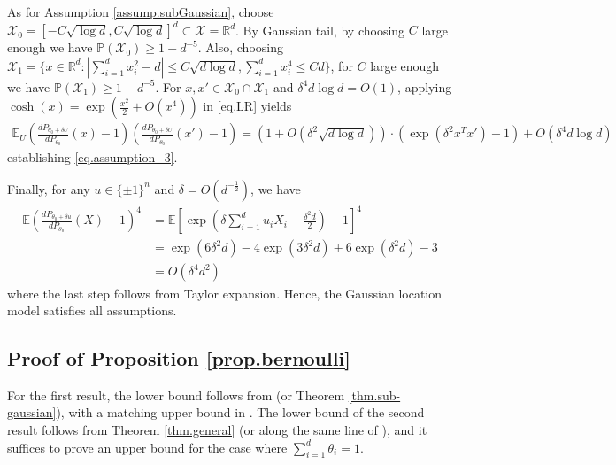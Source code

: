 \documentclass[final,12pt]{colt2018} %
\def \bP {\mathbb{P}}
\def \bE {\mathbb{E}}
\def \bR {\mathbb{R}}
\newcommand{\calX}{{\mathcal{X}}}
\begin{document}
As for Assumption \eqref{assump.subGaussian}, choose $\calX_0 = [-C\sqrt{\log d}, C\sqrt{\log d}]^d\subset \calX=\bR^d$. By Gaussian tail, by choosing $C$ large enough we have $\bP(\calX_0)\ge 1-d^{-5}$. Also, choosing $\calX_1 = \{x\in \bR^d: |\sum_{i=1}^d x_i^2 - d|\le C\sqrt{d\log d}, \sum_{i=1}^d x_i^4\le Cd\}$, for $C$ large enough we have $\bP(\calX_1)\ge 1-d^{-5}$. For $x,x'\in\calX_0\cap\calX_1$ and $\delta^4d\log d=O(1)$, applying $\cosh(x) = \exp(\frac{x^2}{2}+O(x^4))$ in \eqref{eq.LR} yields
\begin{align*}
\bE_U \left( \frac{dP_{\theta_0+\delta U}}{dP_{\theta_0}}(x) - 1 \right)\left( \frac{dP_{\theta_0+\delta U}}{dP_{\theta_0}}(x') - 1 \right) = (1+O(\delta^2\sqrt{d\log d}))\cdot (\exp(\delta^2 x^Tx')-1 ) + O(\delta^4d\log d)
\end{align*}
establishing \eqref{eq.assumption_3}. 

Finally, for any $u\in \{\pm 1\}^n$ and $\delta=O(d^{-\frac{1}{2}})$, we have
\begin{align*}
\bE\left(\frac{dP_{\theta_0+\delta u}}{dP_{\theta_0}}(X) - 1\right)^4 &= \bE \left[ \exp\left(\delta\sum_{i=1}^d u_iX_i - \frac{\delta^2d}{2} \right) - 1 \right]^4 \\
&= \exp(6\delta^2d) - 4\exp(3\delta^2d) + 6\exp(\delta^2d) - 3 \\
&= O(\delta^4d^2)
\end{align*}
where the last step follows from Taylor expansion. Hence, the Gaussian location model satisfies all assumptions. 

\subsection{Proof of Proposition \ref{prop.bernoulli}}
For the first result, the lower bound follows from \cite{zhang2013information} (or Theorem \ref{thm.sub-gaussian}), with a matching upper bound in \cite{zhang2013information}. The lower bound of the second result follows from Theorem \ref{thm.general} (or along the same line of \cite{han2018distributed}), and it suffices to prove an upper bound for the case where $\sum_{i=1}^d \theta_i=1$. 
\end{document}
